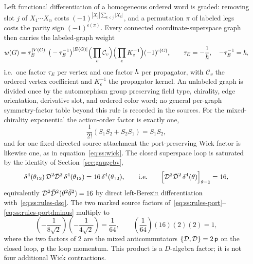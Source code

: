 Left functional differentiation of a homogeneous ordered word is graded: removing slot $j$ of $X_{1}\cdots X_{n}$ costs $(-1)^{|X_{j}|\sum_{k<j}|X_{k}|}$, and a permutation $\pi$ of labeled legs costs the parity sign $(-1)^{\epsilon(\pi)}$. Every connected coordinate-superspace graph then carries the labeled-graph weight
\begin{equation}\label{eq:ss:rules-weight}
w(G)=\tau_{E}^{|V(G)|}\,\big(-\tau_{E}^{-1}\big)^{|E(G)|}
\Big(\prod_{v}\mathcal C_{v}\Big)
\Big(\prod_{e}K_{e}^{-1}\Big)(-1)^{\epsilon(G)},
\qquad
\tau_{E}=-\frac{1}{\hbar},\quad -\tau_{E}^{-1}=\hbar ,
\end{equation}
i.e.\ one factor $\tau_{E}$ per vertex and one factor $\hbar$ per propagator, with $\mathcal C_{v}$ the ordered vertex coefficient and $K_{e}^{-1}$ the propagator kernel. An unlabeled graph is divided once by the automorphism group preserving field type, chirality, edge orientation, derivative slot, and ordered color word; no general per-graph symmetry-factor table beyond this rule is recorded in the sources. For the mixed-chirality exponential the action-order factor is exactly one,
\begin{equation}\label{eq:ss:rules-wick}
\frac{1}{2!}\left(S_{1}S_{2}+S_{2}S_{1}\right)=S_{1}S_{2},
\end{equation}
and for one fixed directed source attachment the port-preserving Wick factor is likewise one, as in equation~\eqref{eq:ss:wick}. The closed superspace loop is saturated by the identity of Section~\ref{sec:gaugebv},
\begin{equation}\label{eq:ss:rules-saturation}
\delta^{4}(\theta_{12})\,\mathcal{D}^{2}\bar{\mathcal{D}}^{2}\,\delta^{4}(\theta_{12})
=16\,\delta^{4}(\theta_{12}),
\qquad\text{i.e.}\qquad
\Big[\mathcal{D}^{2}\bar{\mathcal{D}}^{2}\,\delta^{4}(\theta)\Big]_{\theta=0}=16 ,
\end{equation}
equivalently $\mathcal{D}^{2}\bar{\mathcal{D}}^{2}(\theta^{2}\bar\theta^{2})=16$ by direct left-Berezin differentiation with~\eqref{eq:ss:rules-dsq}. The two marked source factors of~\eqref{eq:ss:rules-port}--\eqref{eq:ss:rules-portdminus} multiply to
\begin{equation}\label{eq:ss:rules-assembly}
\left(-\frac{1}{8\sqrt2}\right)\left(-\frac{1}{4\sqrt2}\right)=\frac{1}{64},
\qquad
\left(\frac{1}{64}\right)(16)(2)(2)=1 ,
\end{equation}
where the two factors of $2$ are the mixed anticommutators $\{\mathcal{D},\bar{\mathcal{D}}\}=2\,\mathsf p$ on the closed loop, $\mathsf p$ the loop momentum. This product is a $D$-algebra factor; it is not four additional Wick contractions.

